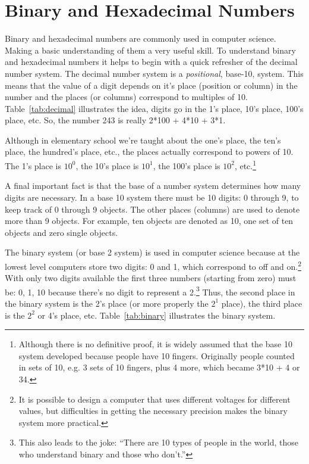 \chapter{Binary and Hexadecimal Numbers}\label{appendix:binary}\label{appendix:hexadecimal}

Binary and hexadecimal numbers are commonly used in computer science.  Making a basic understanding of them a very useful skill.
To understand binary and hexadecimal numbers it helps to begin with a quick refresher of the decimal number system.  The decimal number system is a \emph{positional}, base-10, system.  This means that the value of a digit depends on it's place (position or column)  in the number and the places (or columns) correspond to multiples of 10.  Table~\ref{tab:decimal} illustrates the idea, digits go in the 1's place, 10's place, 100's place, etc. So, the number 243 is really 2*100 + 4*10 + 3*1.  

Although in elementary school we're taught about the one's place, the ten's place, the hundred's place, etc., the places actually correspond to powers of 10.  The 1's place is $10^{0}$, the 10's place is $10^{1}$, the 100's place is $10^{2}$, etc.\footnote{Although there is no definitive proof, it is widely assumed that the base 10 system developed because people have 10 fingers.  Originally people counted in sets of 10, e.g. 3 sets of 10 fingers, plus 4 more, which became 3*10 + 4 or 34.}

A final important fact is that the base of a number system determines how many digits are necessary.  In a base 10 system there must be 10 digits: 0 through 9, to keep track of 0 through 9 objects.  The other places (columns) are used to denote more than 9 objects.  For example, ten objects are denoted as 10, one set of ten objects and zero single objects.

The binary system (or base 2 system) is used in computer science because at the lowest level computers store two digits: 0 and 1, which  correspond to off and on.\footnote{It is possible to design a computer that uses different voltages for different values, but difficulties in getting the necessary precision makes the binary system more practical.}  With only two digits available the first three numbers (starting from zero) must be: 0, 1, 10 because there's no digit to represent a 2.\footnote{This also leads to the joke: ``There are 10 types of people in the world, those who understand binary and those who don't.''}  Thus, the second place in the binary system is the 2's place (or more properly the $2^{1}$ place), the third place is the $2^{2}$ or 4's place, etc.  Table~\ref{tab:binary} illustrates the binary system.

